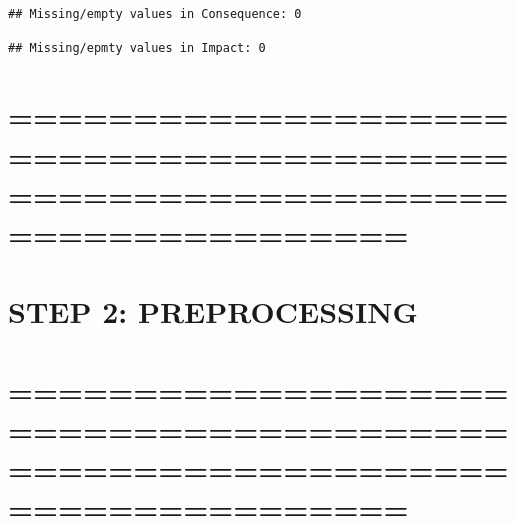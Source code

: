 \documentclass[
]{article}
\newenvironment{Shaded}{\begin{snugshade}}{\end{snugshade}}
\newcommand{\FunctionTok}[1]{\textcolor[rgb]{0.13,0.29,0.53}{\textbf{#1}}}
\newcommand{\NormalTok}[1]{#1}
\newcommand{\SpecialCharTok}[1]{\textcolor[rgb]{0.81,0.36,0.00}{\textbf{#1}}}
\newcommand{\StringTok}[1]{\textcolor[rgb]{0.31,0.60,0.02}{#1}}
\begin{document}
\begin{Shaded}
\end{Shaded}

\begin{verbatim}
## Missing/empty values in Consequence: 0
\end{verbatim}

\begin{Shaded}
\end{Shaded}

\begin{verbatim}
## Missing/epmty values in Impact: 0
\end{verbatim}

\section{============================================================================}\label{section-5}

\section{STEP 2: PREPROCESSING}\label{step-2-preprocessing}

\section{============================================================================}\label{section-6}
\end{document}
